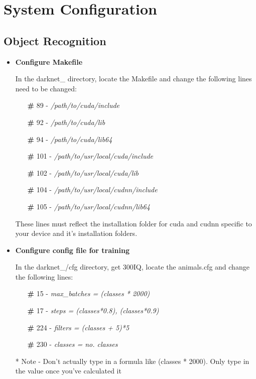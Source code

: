 \chapter{System Configuration}
\section{Object Recognition}

\begin{itemize}
\item \textbf{Configure Makefile}

In the darknet\_ directory, locate the Makefile and change the following lines need to be changed:

\begin{itemize}
    \item[\textbf{\#}] 89  - \textit{/path/to/cuda/include}
    \item[\textbf{\#}] 92 - \textit{/path/to/cuda/lib}
    \item[\textbf{\#}] 94 - \textit{/path/to/cuda/lib64}
    \item[\textbf{\#}] 101 - \textit{/path/to/usr/local/cuda/include}
    \item[\textbf{\#}] 102 - \textit{/path/to/usr/local/cuda/lib}
    \item[\textbf{\#}] 104 - \textit{/path/to/usr/local/cudnn/include}
    \item[\textbf{\#}] 105 - \textit{/path/to/usr/local/cudnn/lib64}
\end{itemize}

These lines must reflect the installation folder for cuda and cudnn specific to your device and it's installation folders.

\item \textbf{Configure config file for training}

In the darknet\_/cfg directory, get 300IQ, locate the animals.cfg and change the following lines:

\begin{itemize}
    \item[\textbf{\#}] 15  - \textit{max\_batches = (classes * 2000)}
    \item[\textbf{\#}] 17 - \textit{steps = (classes*0.8), (classes*0.9)}
    \item[\textbf{\#}] 224 - \textit{filters = (classes + 5)*5}
    \item[\textbf{\#}] 230 - \textit{classes = no. classes}
\end{itemize}

* Note - Don't actually type in a formula like (classes * 2000). Only type in the value once you've calculated it

\end{itemize}


